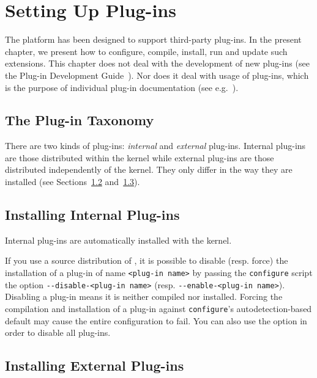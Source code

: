 \chapter{Setting Up Plug-ins}
\label{user-plugins}

The \FramaC platform has been designed to support third-party plug-ins. In the
present chapter, we present how to configure, compile, install, run and update
such extensions. This chapter does not deal with the development of new plug-ins (see the \textsf{Plug-in Development
  Guide}~\cite{plugin-dev-guide}). Nor does it deal with usage
of plug-ins, which is the purpose of individual plug-in documentation (see e.g.~\cite{value,wp,slicing}).

\section{The Plug-in Taxonomy}\label{sec:plugin-taxonomy}

There are two kinds of plug-ins: \emph{internal} and \emph{external} plug-ins.
Internal plug-ins are those distributed within the \FramaC kernel while
external plug-ins are those distributed independently of the \FramaC
kernel. They only differ in the way they are installed (see
Sections~\ref{sec:install-internal} and~\ref{sec:install-external}).

\section{Installing Internal Plug-ins}\label{sec:install-internal}

Internal plug-ins are automatically installed with the \FramaC kernel.

If you use a source distribution of \FramaC, it is possible to disable (resp.
force) the installation of a plug-in of name \texttt{<plug-in name>} by passing
the {\tt configure} script the option \texttt{-{}-disable-<plug-in name>}
(resp. \texttt{-{}-enable-<plug-in name>}). Disabling a plug-in means it is
neither compiled nor installed. Forcing the compilation and installation of a
plug-in against {\tt configure}'s autodetection-based default may cause the
entire \FramaC configuration to fail. You can also use the option
 in order to disable all plug-ins.

\section{Installing External Plug-ins}\label{sec:install-external}

